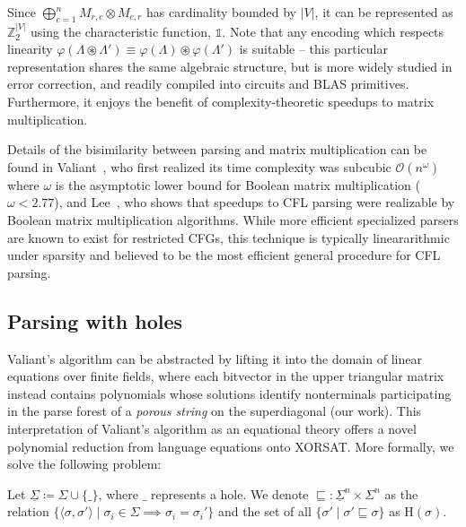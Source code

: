 \documentclass[sigplan,review,anonymous,acmsmall]{acmart}\settopmatter{printfolios=false,printccs=false,printacmref=false}
\begin{document}
Since $\bigoplus_{c = 1}^n M_{r,c} \otimes M_{c,r}$ has cardinality bounded by $|V|$, it can be represented as $\mathbb{Z}_2^{|V|}$ using the characteristic function, $\mathds{1}$. Note that any encoding which respects linearity $\varphi(\Lambda \circledast \Lambda') \equiv \varphi(\Lambda) \circledast \varphi(\Lambda')$ is suitable -- this particular representation shares the same algebraic structure, but is more widely studied in error correction, and readily compiled into circuits and BLAS primitives. Furthermore, it enjoys the benefit of complexity-theoretic speedups to matrix multiplication.

Details of the bisimilarity between parsing and matrix multiplication can be found in Valiant~\cite{valiant1975general}, who first realized its time complexity was subcubic $\mathcal{O}(n^\omega)$ where $\omega$ is the asymptotic lower bound for Boolean matrix multiplication ($\omega < 2.77$), and Lee~\cite{lee2002fast}, who shows that speedups to CFL parsing were realizable by Boolean matrix multiplication algorithms. While more efficient specialized parsers are known to exist for restricted CFGs, this technique is typically lineararithmic under sparsity and believed to be the most efficient general procedure for CFL parsing.

\subsection{Parsing with holes}

Valiant's algorithm can be abstracted by lifting it into the domain of linear equations over finite fields, where each bitvector in the upper triangular matrix instead contains polynomials whose solutions identify nonterminals participating in the parse forest of a \textit{porous string} on the superdiagonal (our work). This interpretation of Valiant's algorithm as an equational theory offers a novel polynomial reduction from language equations onto XORSAT. More formally, we solve the following problem:%

\begin{definition}
  Let $\underline\Sigma \coloneqq \Sigma \cup \{\_\}$, where $\_$ represents a hole. We denote $\sqsubseteq: \underline\Sigma^n \times \Sigma^n$ as the relation $\{\langle\sigma, \sigma'\rangle \mid \sigma_i \in \Sigma \implies \sigma_i = \sigma_i'\}$ and the set of all $\{\sigma' \mid \sigma' \sqsubseteq \sigma\}$ as $\text{H}(\sigma)$.
\end{definition}
\end{document}
